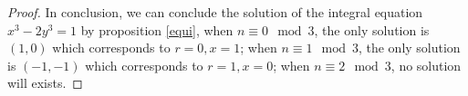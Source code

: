 \begin{theorem}
\begin{proof}
         In conclusion, we can conclude the solution of the integral equation \(x^3-2y^3=1\) by proposition \ref{equi}, when \(n \equiv 0 \mod 3\),  the only solution is \((1,0)\) which corresponds to \(r=0, x=1\); when \(n \equiv 1 \mod 3\), the only solution is \((-1,-1)\) which corresponds to \(r=1,x=0\); when \(n \equiv 2 \mod 3\), no solution will exists.
    \end{proof}

    
    \end{theorem}


